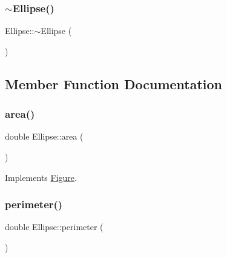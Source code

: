 \mbox{\label{class_ellipse_a94271a8a2b16101a52491b7e81e28547}} 
\subsubsection{\texorpdfstring{$\sim$\+Ellipse()}{~Ellipse()}}
{\footnotesize\ttfamily Ellipse\+::$\sim$\+Ellipse (\begin{DoxyParamCaption}{ }\end{DoxyParamCaption})\hspace{0.3cm}{\ttfamily [inline]}}



\subsection{Member Function Documentation}
\mbox{\label{class_ellipse_ad3de2759830df27c4ae1e65ecf46e7a1}} 
\subsubsection{\texorpdfstring{area()}{area()}}
{\footnotesize\ttfamily double Ellipse\+::area (\begin{DoxyParamCaption}{ }\end{DoxyParamCaption})\hspace{0.3cm}{\ttfamily [virtual]}}



Implements \hyperlink{class_figure_a9860bda67fc9ce8127a812e167c4ce75}{Figure}.

\mbox{\label{class_ellipse_a367ca002c3a95761d0b913f98bc4eb6e}} 
\subsubsection{\texorpdfstring{perimeter()}{perimeter()}}
{\footnotesize\ttfamily double Ellipse\+::perimeter (\begin{DoxyParamCaption}{ }\end{DoxyParamCaption})\hspace{0.3cm}{\ttfamily [virtual]}}



